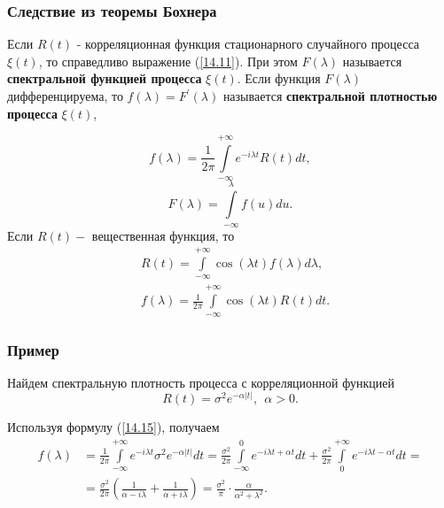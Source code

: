    \subsubsection{Следствие из теоремы Бохнера}

    Если $R(t)$ - корреляционная функция стационарного случайного процесса $\xi(t)$, то справедливо выражение (\ref{14.11}). При этом $F(\lambda)$ называется \textbf{спектральной функцией процесса} $\xi(t)$. Если функция $F(\lambda)$ дифференцируема, то $f(\lambda)=F^{\prime}(\lambda)$ называется \textbf{спектральной плотностью процесса} $\xi(t)$,
    
    \begin{equation}
        f(\lambda)=\frac{1}{2 \pi} \int\limits_{-\infty}^{+\infty} e^{-i \lambda t} R(t) d t ,
        \label{14.15}
    \end{equation}
    $$
    F(\lambda)=\int\limits_{-\infty}^\lambda f(u) d u .
    $$
    Если $R(t)-$ вещественная функция, то
    $$
    \begin{aligned}
    & R(t)=\int\limits_{-\infty}^{+\infty} \cos (\lambda t) f(\lambda) d \lambda , \\
    & f(\lambda)=\frac{1}{2 \pi} \int\limits_{-\infty}^{+\infty} \cos (\lambda t) R(t) d t .
    \end{aligned}
    $$

    \subsubsection{Пример}
    Найдем спектральную плотность процесса с корреляционной функцией
    $$
    R(t)=\sigma^2 e^{-\alpha|t|}, \ \  \alpha>0 .
    $$
    
    Используя формулу (\ref{14.15}), получаем
    $$
    \begin{aligned}
    f(\lambda) & = \frac{1}{2 \pi} \int\limits_{-\infty}^{+\infty} e^{-i \lambda t} \sigma^2 e^{-\alpha|t|} d t =  \frac{\sigma^2}{2 \pi} \int\limits_{-\infty}^0 e^{-i \lambda t+\alpha t} d t+\frac{\sigma^2}{2 \pi} \int\limits_0^{+\infty} e^{-i \lambda t-\alpha t} d t= \\
    & =  \frac{\sigma^2}{2 \pi}\left(\frac{1}{\alpha-i \lambda}+\frac{1}{\alpha+i \lambda}\right)=\frac{\sigma^2}{\pi} \cdot \frac{\alpha}{\alpha^2+\lambda^2} .
    \end{aligned}
    $$
   

